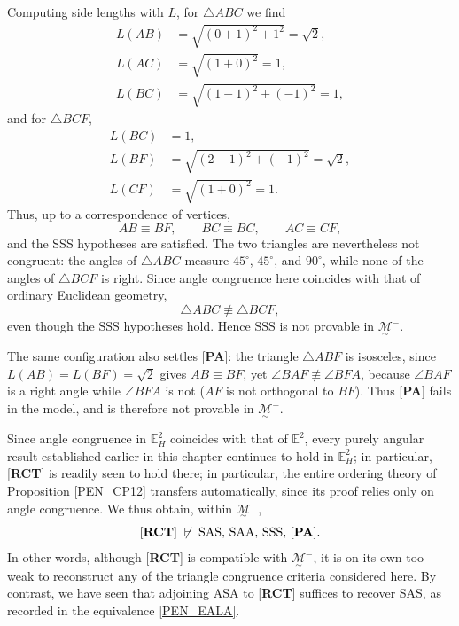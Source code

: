 \documentclass[11pt,a4paper]{article}
\theoremstyle{definition}
\theoremstyle{remark}
\numberwithin{equation}{section}
\newcommand{\MG}{\underset{\sim}{\mathcal{M}}} %
\begin{document}
Computing side lengths with $L$, for $\triangle ABC$ we find
\begin{align*}
L(AB)
&=
\sqrt{(0+1)^2+1^2}
=\sqrt2,\\
L(AC)
&=
\sqrt{(1+0)^2}
=1,\\
L(BC)
&=
\sqrt{(1-1)^2+(-1)^2}
=1,
\end{align*}
and for $\triangle BCF$,
\begin{align*}
L(BC)
&=1,\\
L(BF)
&=
\sqrt{(2-1)^2+(-1)^2}
=\sqrt2,\\
L(CF)
&=
\sqrt{(1+0)^2}
=1.
\end{align*}
Thus, up to a correspondence of vertices,
\begin{equation*}
AB\equiv BF,\qquad
BC\equiv BC,\qquad
AC\equiv CF,
\end{equation*}
and the SSS hypotheses are satisfied. The two triangles are nevertheless not congruent: the
angles of $\triangle ABC$ measure $45^\circ$, $45^\circ$, and $90^\circ$, while none of the
angles of $\triangle BCF$ is right. Since angle congruence here coincides with that of ordinary
Euclidean geometry,
\begin{equation*}
\triangle ABC\not\equiv\triangle BCF,
\end{equation*}
even though the SSS hypotheses hold. Hence SSS is not provable in $\MG^{-}$.

The same configuration also settles [\textbf{PA}]: the triangle $\triangle ABF$ is isosceles,
since $L(AB)=L(BF)=\sqrt2$ gives $AB\equiv BF$, yet $\angle BAF\not\equiv\angle BFA$, because
$\angle BAF$ is a right angle while $\angle BFA$ is not ($AF$ is not orthogonal to $BF$). Thus
[\textbf{PA}] fails in the model, and is therefore not provable in $\MG^{-}$.

Since angle congruence in $\mathbb{E}_{H}^{2}$ coincides with that of $\mathbb{E}^{2}$, every
purely angular result established earlier in this chapter continues to hold in
$\mathbb{E}_{H}^{2}$; in particular, [\textbf{RCT}] is readily seen to hold there; in particular, the entire ordering theory of Proposition \ref{PEN_CP12} transfers automatically, since its proof relies only on angle congruence. We thus
obtain, within $\MG^{-}$,
\begin{equation*}
\textrm{[\textbf{RCT}]}
\;\not\vdash\;
\textrm{SAS, SAA, SSS, [\textbf{PA}]}.
\end{equation*}
In other words, although [\textbf{RCT}] is compatible with $\MG^{-}$, it is on its own too weak
to reconstruct any of the triangle congruence criteria considered here. By contrast, we have
seen that adjoining ASA to [\textbf{RCT}] suffices to recover SAS, as recorded in the
equivalence \eqref{PEN_EALA}.
\end{document}
